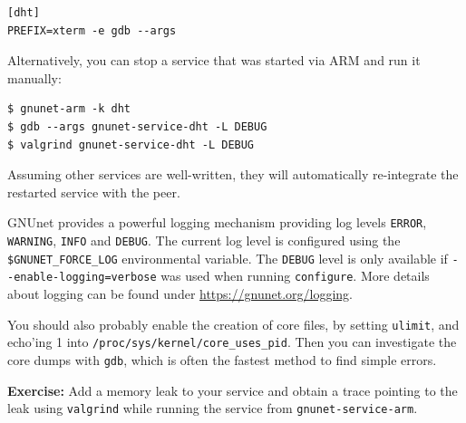 \documentclass[10pt]{article}
\newcommand{\exercise}[1]{\noindent\begin{boxedminipage}{\textwidth}{\bf Exercise:} #1 \end{boxedminipage}}
\begin{document}
\begin{verbatim}
[dht]
PREFIX=xterm -e gdb --args
\end{verbatim}

Alternatively, you can stop a service that was started via ARM and run it manually:

\lstset{language=bash}
\begin{lstlisting}
$ gnunet-arm -k dht
$ gdb --args gnunet-service-dht -L DEBUG
$ valgrind gnunet-service-dht -L DEBUG
\end{lstlisting}

Assuming other services are well-written, they will automatically re-integrate the
restarted service with the peer.

GNUnet provides a powerful logging mechanism providing log levels \texttt{ERROR},
\texttt{WARNING}, \texttt{INFO} and \texttt{DEBUG}. The current log level is
configured using the \lstinline|$GNUNET_FORCE_LOG| environmental variable.
The \texttt{DEBUG} level is only available if \lstinline|--enable-logging=verbose| was used when
running \texttt{configure}. More details about logging can be found under
\url{https://gnunet.org/logging}.

You should also probably enable the creation of core files, by setting
{\tt ulimit}, and echo'ing 1 into {\tt /proc/sys/kernel/core\_uses\_pid}.
Then you can investigate the core dumps with {\tt gdb}, which is often
the fastest method to find simple errors.

\exercise{Add a memory leak to your service and obtain a trace
pointing to the leak using {\tt valgrind} while running the service
from {\tt gnunet-service-arm}.}
\end{document}
